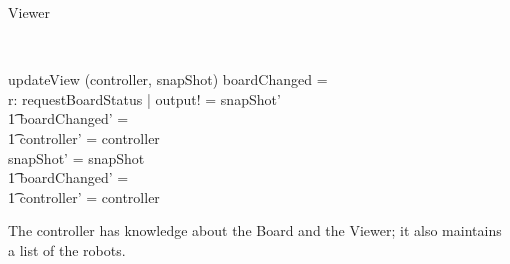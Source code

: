 \documentclass[12pt]{article}
\begin{document}
\begin{class}{Viewer}
\begin{classcom}
\end{classcom} \\
\begin{schema}{updateView}
\Delta (controller, snapShot)
\where
\IF boardChanged = \true \\
\THEN \exists r: requestBoardStatus | output! = snapShot' \\ \t1
boardChanged' = \false \\ \t1
controller' = controller \\
\ELSE snapShot' = snapShot \\ \t1
boardChanged' = \false \\ \t1
controller' = controller
\end{schema}
\end{class}

The controller has knowledge about the Board and the Viewer; it also maintains a list of the robots.
\end{document}
